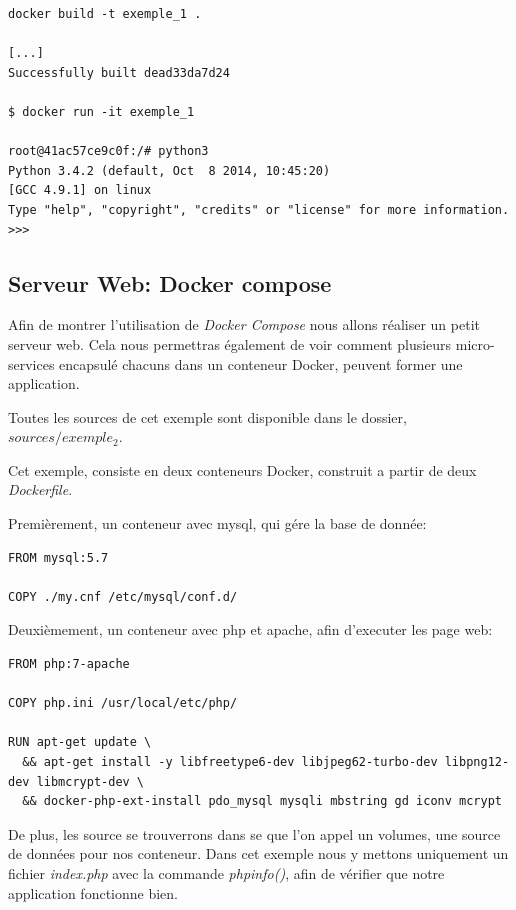 \begin{lstlisting}[frame=single]
docker build -t exemple_1 .

[...]
Successfully built dead33da7d24

$ docker run -it exemple_1

root@41ac57ce9c0f:/# python3
Python 3.4.2 (default, Oct  8 2014, 10:45:20) 
[GCC 4.9.1] on linux
Type "help", "copyright", "credits" or "license" for more information.
>>> 

\end{lstlisting}

\subsection{Serveur Web: Docker compose}
Afin de montrer l'utilisation de \emph{Docker Compose} nous allons réaliser un petit serveur web. Cela nous permettras également de voir comment plusieurs micro-services encapsulé chacuns dans un conteneur Docker, peuvent former une application.

Toutes les sources de cet exemple sont disponible dans le dossier, \emph{$sources/exemple_2$}.

Cet exemple, consiste en deux conteneurs Docker, construit a partir de deux \emph{Dockerfile}.

Premièrement, un conteneur avec mysql, qui gére la base de donnée:

\begin{lstlisting}[frame=single]
FROM mysql:5.7

COPY ./my.cnf /etc/mysql/conf.d/
\end{lstlisting}

Deuxièmement, un conteneur avec php et apache, afin d'executer les page web:

\begin{lstlisting}[frame=single]
FROM php:7-apache

COPY php.ini /usr/local/etc/php/

RUN apt-get update \
  && apt-get install -y libfreetype6-dev libjpeg62-turbo-dev libpng12-dev libmcrypt-dev \
  && docker-php-ext-install pdo_mysql mysqli mbstring gd iconv mcrypt
\end{lstlisting}

De plus, les source se trouverrons dans se que l'on appel un volumes, une source de données pour nos conteneur. Dans cet exemple nous y mettons uniquement un fichier \emph{index.php} avec la commande \emph{phpinfo()}, afin de vérifier que notre application fonctionne bien.

